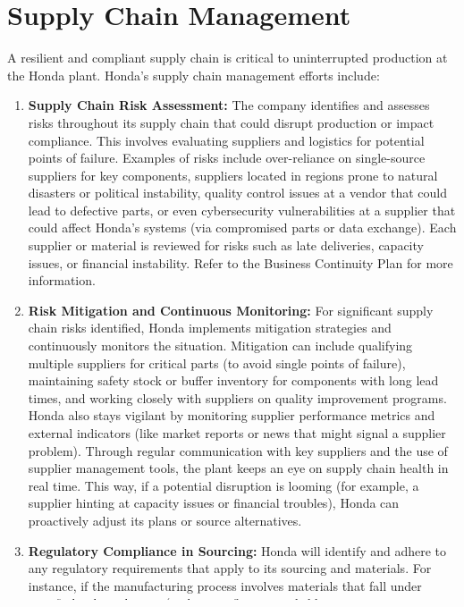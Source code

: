 \section{Supply Chain Management}
A resilient and compliant supply chain is critical to uninterrupted production at the Honda plant. Honda’s supply chain management efforts include:
\begin{enumerate}
    \item \textbf{Supply Chain Risk Assessment:} The company identifies and assesses risks throughout its supply chain that could disrupt production or impact compliance. This involves evaluating suppliers and logistics for potential points of failure. Examples of risks include over-reliance on single-source suppliers for key components, suppliers located in regions prone to natural disasters or political instability, quality control issues at a vendor that could lead to defective parts, or even cybersecurity vulnerabilities at a supplier that could affect Honda’s systems (via compromised parts or data exchange). Each supplier or material is reviewed for risks such as late deliveries, capacity issues, or financial instability. Refer to the Business Continuity Plan for more information.
    \item \textbf{Risk Mitigation and Continuous Monitoring:} For significant supply chain risks identified, Honda implements mitigation strategies and continuously monitors the situation. Mitigation can include qualifying multiple suppliers for critical parts (to avoid single points of failure), maintaining safety stock or buffer inventory for components with long lead times, and working closely with suppliers on quality improvement programs. Honda also stays vigilant by monitoring supplier performance metrics and external indicators (like market reports or news that might signal a supplier problem). Through regular communication with key suppliers and the use of supplier management tools, the plant keeps an eye on supply chain health in real time. This way, if a potential disruption is looming (for example, a supplier hinting at capacity issues or financial troubles), Honda can proactively adjust its plans or source alternatives.
    \item \textbf{Regulatory Compliance in Sourcing:} Honda will identify and adhere to any regulatory requirements that apply to its sourcing and materials. For instance, if the manufacturing process involves materials that fall under specific legal regulations (such as conflict minerals like tin, tungsten, tantalum, and gold, which require due diligence and reporting under U.S. law), the company ensures those requirements are met. Additionally, import/export regulations, trade compliance (including tariffs or restricted trade partner screening), and environmental or safety regulations related to materials (like restrictions on hazardous substances in parts) are all considered when selecting suppliers and materials. By ensuring that sourced parts and materials comply with relevant laws and standards, Honda avoids legal complications and upholds ethical sourcing principles.

\end{enumerate}
